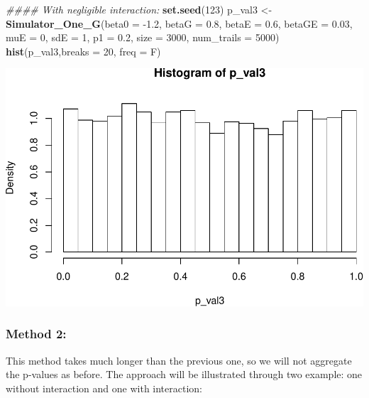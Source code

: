 \documentclass[]{article}
\newenvironment{Shaded}{\begin{snugshade}}{\end{snugshade}}
\newcommand{\CommentTok}[1]{\textcolor[rgb]{0.56,0.35,0.01}{\textit{#1}}}
\newcommand{\DataTypeTok}[1]{\textcolor[rgb]{0.13,0.29,0.53}{#1}}
\newcommand{\DecValTok}[1]{\textcolor[rgb]{0.00,0.00,0.81}{#1}}
\newcommand{\FloatTok}[1]{\textcolor[rgb]{0.00,0.00,0.81}{#1}}
\newcommand{\KeywordTok}[1]{\textcolor[rgb]{0.13,0.29,0.53}{\textbf{#1}}}
\newcommand{\NormalTok}[1]{#1}
\newcommand{\StringTok}[1]{\textcolor[rgb]{0.31,0.60,0.02}{#1}}
\begin{document}
\begin{Shaded}
\begin{Highlighting}[]
\CommentTok{#### With negligible interaction:}
\KeywordTok{set.seed}\NormalTok{(}\DecValTok{123}\NormalTok{)}
\NormalTok{p_val3 <-}\StringTok{ }\KeywordTok{Simulator_One_G}\NormalTok{(}\DataTypeTok{beta0 =} \FloatTok{-1.2}\NormalTok{, }\DataTypeTok{betaG =} \FloatTok{0.8}\NormalTok{, }\DataTypeTok{betaE =} \FloatTok{0.6}\NormalTok{, }\DataTypeTok{betaGE =} \FloatTok{0.03}\NormalTok{, }\DataTypeTok{muE =} \DecValTok{0}\NormalTok{, }\DataTypeTok{sdE =} \DecValTok{1}\NormalTok{, }\DataTypeTok{p1 =} \FloatTok{0.2}\NormalTok{, }\DataTypeTok{size =} \DecValTok{3000}\NormalTok{, }\DataTypeTok{num_trails =} \DecValTok{5000}\NormalTok{)}
\KeywordTok{hist}\NormalTok{(p_val3,}\DataTypeTok{breaks =} \DecValTok{20}\NormalTok{, }\DataTypeTok{freq =}\NormalTok{ F)}
\end{Highlighting}
\end{Shaded}

\includegraphics{stats-gene-research-progress-v4_files/figure-latex/unnamed-chunk-1-4.pdf}

\hypertarget{method-2}{%
\subsubsection{Method 2:}\label{method-2}}

This method takes much longer than the previous one, so we will not
aggregate the p-values as before. The approach will be illustrated
through two example: one without interaction and one with interaction:
\end{document}
